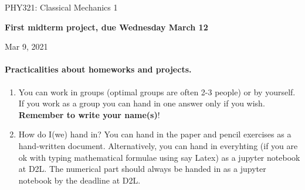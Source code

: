 \documentclass[%
oneside,                 %
final,                   %
10pt]{article}
\begin{document}

\newcommand{\exercisesection}[1]{\subsection*{#1}}






\thispagestyle{empty}

\begin{center}
{\LARGE\bf
\begin{spacing}{1.25}
PHY321: Classical Mechanics 1
\end{spacing}
}
\end{center}


\begin{center}
{\bf First midterm project, due Wednesday March 12${}^{}$} \\ [0mm]
\end{center}

\begin{center}
\end{center}
    

\begin{center}
Mar 9, 2021
\end{center}

\vspace{1cm}


\paragraph{Practicalities about  homeworks and projects.}
\begin{enumerate}
\item You can work in groups (optimal groups are often 2-3 people) or by yourself. If you work as a group you can hand in one answer only if you wish. \textbf{Remember to write your name(s)}!

\item How do I(we)  hand in?  You can hand in the paper and pencil exercises as a hand-written document. Alternatively, you can hand in everyhting (if you are ok with typing mathematical formulae using say Latex) as a jupyter notebook at D2L. The numerical part should always be handed in as a jupyter notebook by the deadline at D2L. 
\end{enumerate}
\end{document}
